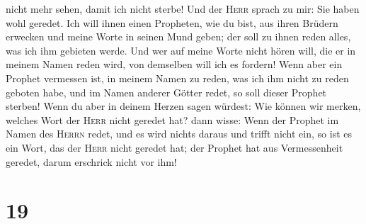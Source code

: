 nicht mehr sehen, damit ich nicht sterbe!  Und der
\textsc{Herr} sprach zu mir: Sie haben wohl geredet.  Ich
will ihnen einen Propheten, wie du bist, aus ihren Brüdern erwecken und
meine Worte in seinen Mund geben; der soll zu ihnen reden alles, was ich
ihm gebieten werde.  Und wer auf meine Worte nicht hören
will, die er in meinem Namen reden wird, von demselben will ich es
fordern!  Wenn aber ein Prophet vermessen ist, in meinem
Namen zu reden, was ich ihm nicht zu reden geboten habe, und im Namen
anderer Götter redet, so soll dieser Prophet sterben! 
Wenn du aber in deinem Herzen sagen würdest: Wie können wir merken,
welches Wort der \textsc{Herr} nicht geredet hat?  dann
wisse: Wenn der Prophet im Namen des \textsc{Herrn} redet, und es wird
nichts daraus und trifft nicht ein, so ist es ein Wort, das der
\textsc{Herr} nicht geredet hat; der Prophet hat aus Vermessenheit
geredet, darum erschrick nicht vor ihm!

\hypertarget{section-18}{%
\section{19}\label{section-18}}

